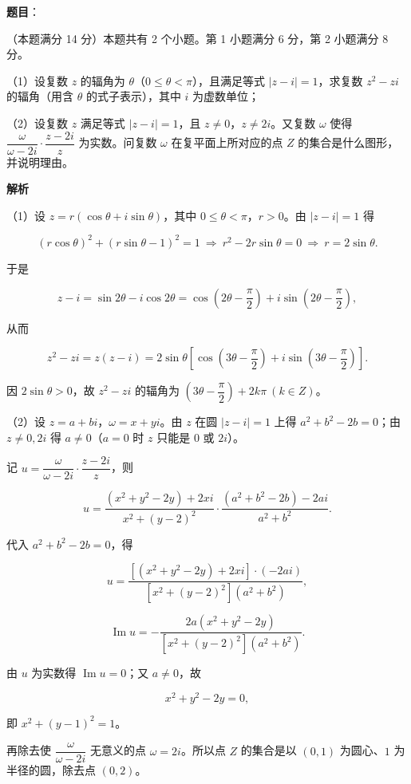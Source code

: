 \begin{answer}

\textbf{题目}：

（本题满分 14 分）本题共有 2 个小题。第 1 小题满分 6 分，第 2 小题满分 8 分。

（1）设复数 $z$ 的辐角为 $\theta$（$0\le\theta<\pi$），且满足等式 $|z-i|=1$，求复数 $z^{2}-zi$ 的辐角（用含 $\theta$ 的式子表示），其中 $i$ 为虚数单位；

（2）设复数 $z$ 满足等式 $|z-i|=1$，且 $z\ne 0$，$z\ne 2i$。又复数 $\omega$ 使得 $\dfrac{\omega}{\omega-2i}\cdot\dfrac{z-2i}{z}$ 为实数。问复数 $\omega$ 在复平面上所对应的点 $Z$ 的集合是什么图形，并说明理由。

\textbf{解析}

（1）设 $z=r(\cos\theta+i\sin\theta)$，其中 $0\le\theta<\pi$，$r>0$。由 $|z-i|=1$ 得

\nopagebreak[4]
\[
(r\cos\theta)^{2}+(r\sin\theta-1)^{2}=1\ \Longrightarrow\ r^{2}-2r\sin\theta=0\ \Longrightarrow\ r=2\sin\theta.
\]

于是

\nopagebreak[4]
\[
z-i=\sin 2\theta-i\cos 2\theta=\cos\left(2\theta-\frac{\pi}{2}\right)+i\sin\left(2\theta-\frac{\pi}{2}\right),
\]

从而

\nopagebreak[4]
\[
z^{2}-zi=z(z-i)=2\sin\theta\left[\cos\left(3\theta-\frac{\pi}{2}\right)+i\sin\left(3\theta-\frac{\pi}{2}\right)\right].
\]

因 $2\sin\theta>0$，故 $z^{2}-zi$ 的辐角为 $\left(3\theta-\dfrac{\pi}{2}\right)+2k\pi\ (k\in Z)$。

（2）设 $z=a+bi$，$\omega=x+yi$。由 $z$ 在圆 $|z-i|=1$ 上得 $a^{2}+b^{2}-2b=0$；由 $z\ne 0,2i$ 得 $a\ne 0$（$a=0$ 时 $z$ 只能是 $0$ 或 $2i$）。

记 $u=\dfrac{\omega}{\omega-2i}\cdot\dfrac{z-2i}{z}$，则

\nopagebreak[4]
\[
u=\frac{(x^{2}+y^{2}-2y)+2xi}{x^{2}+(y-2)^{2}}\cdot\frac{(a^{2}+b^{2}-2b)-2ai}{a^{2}+b^{2}}.
\]

代入 $a^{2}+b^{2}-2b=0$，得

\nopagebreak[4]
\[
u=\frac{\left[(x^{2}+y^{2}-2y)+2xi\right]\cdot(-2ai)}{\left[x^{2}+(y-2)^{2}\right](a^{2}+b^{2})},
\]

\nopagebreak[4]
\[
\operatorname{Im}u=-\frac{2a\left(x^{2}+y^{2}-2y\right)}{\left[x^{2}+(y-2)^{2}\right](a^{2}+b^{2})}.
\]

由 $u$ 为实数得 $\operatorname{Im}u=0$；又 $a\ne 0$，故

\nopagebreak[4]
\[
x^{2}+y^{2}-2y=0,
\]

即 $x^{2}+(y-1)^{2}=1$。

再除去使 $\dfrac{\omega}{\omega-2i}$ 无意义的点 $\omega=2i$。所以点 $Z$ 的集合是以 $(0,1)$ 为圆心、$1$ 为半径的圆，除去点 $(0,2)$。


\end{answer}

